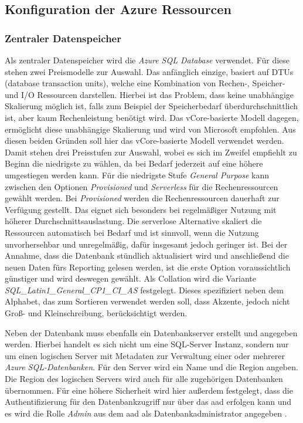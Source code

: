 \subsection{Konfiguration der Azure Ressourcen} \label{sec:umsetzen:konfiguration}

\subsubsection{Zentraler Datenspeicher} \label{subsec:umsetzen:konfiguration:datenspeicher}
Als zentraler Datenspeicher wird die \textit{Azure SQL Database} verwendet. Für diese stehen zwei Preismodelle zur Auswahl. Das anfänglich einzige, basiert auf DTUs (database transaction units), welche eine Kombination von Rechen-, Speicher- und I/O Ressourcen darstellen. Hierbei ist das Problem, dass keine unabhängige Skalierung möglich ist, falls zum Beispiel der Speicherbedarf überdurchschnittlich ist, aber kaum Rechenleistung benötigt wird. Das vCore-basierte Modell dagegen, ermöglicht diese unabhängige Skalierung und wird von Microsoft empfohlen. Aus diesen beiden Gründen soll hier das vCore-basierte Modell verwendet werden. Damit stehen drei Preisstufen zur Auswahl, wobei es sich im Zweifel empfiehlt zu Beginn die niedrigste zu wählen, da bei Bedarf jederzeit auf eine höhere umgestiegen werden kann. Für die niedrigste Stufe \textit{General Purpose} kann zwischen den Optionen \textit{Provisioned} und \textit{Serverless} für die Rechenressourcen gewählt werden. Bei \textit{Provisioned} werden die Rechenressourcen dauerhaft zur Verfügung gestellt. Das eignet sich besonders bei regelmäßiger Nutzung mit höherer Durchschnittsauslastung. Die serverlose Alternative skaliert die Ressourcen automatisch bei Bedarf und ist sinnvoll, wenn die Nutzung unvorhersehbar und unregelmäßig, dafür insgesamt jedoch geringer ist. Bei der Annahme, dass die Datenbank stündlich aktualisiert wird und anschließend die neuen Daten fürs Reporting gelesen werden, ist die erste Option voraussichtlich günstiger und wird deswegen gewählt. Als Collation wird die Variante \textit{SQL{\_}Latin1{\_}General{\_}CP1{\_}CI{\_}AS} festgelegt. Dieses spezifiziert neben dem Alphabet, das zum Sortieren verwendet werden soll, dass Akzente, jedoch nicht Groß- und Kleinschreibung, berücksichtigt werden. \cite[vgl.][]{mauri_azure_2021}

Neben der Datenbank muss ebenfalls ein Datenbankserver erstellt und angegeben werden. Hierbei handelt es sich nicht um eine SQL-Server Instanz, sondern nur um einen logischen Server mit Metadaten zur Verwaltung einer oder mehrerer \textit{Azure SQL-Datenbanken}. Für den Server wird ein Name und die Region angeben. Die Region des logischen Servers wird auch für alle zugehörigen Datenbanken übernommen. Für eine höhere Sicherheit wird hier außerdem festgelegt, dass die Authentifizierung für den Datenbankzugriff nur über das \ac{aad} erfolgen kann und es wird die Rolle \textit{Admin} aus dem \ac{aad} als Datenbankadministrator angegeben  \cite[vgl.][]{ward_azure_2021}.

